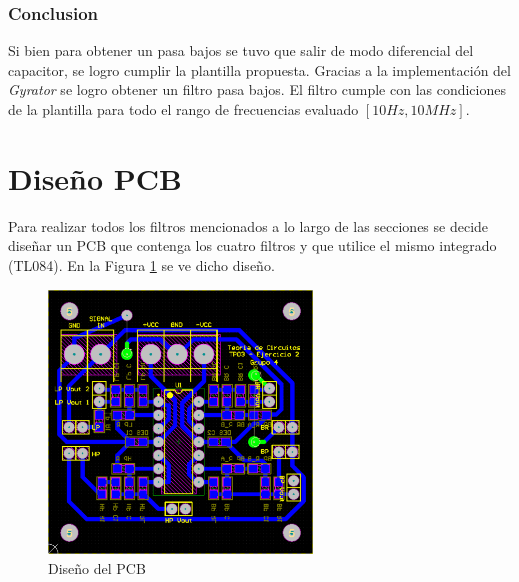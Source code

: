 \subsubsection{Conclusion}

Si bien para obtener un pasa bajos se tuvo que salir de modo diferencial del capacitor, se logro cumplir la plantilla propuesta. Gracias a la implementación del \textit{Gyrator} se logro obtener un filtro pasa bajos. El filtro cumple con las condiciones de la plantilla para todo el rango de frecuencias evaluado $[10Hz,10MHz]$.


\section{Diseño PCB}

Para realizar todos los filtros mencionados a lo largo de las secciones se decide diseñar un PCB que contenga los cuatro filtros y que utilice el mismo integrado (TL084). En la Figura \ref{fig:pcb} se ve dicho diseño. 

\begin{figure}[h!]                                                       
    \centering\includegraphics[width=7cm, height=7cm]{../Ex2/Resources/ej2_pcb.png}
    \caption{Diseño del PCB }
    \label{fig:pcb}
    \end{figure}
    



